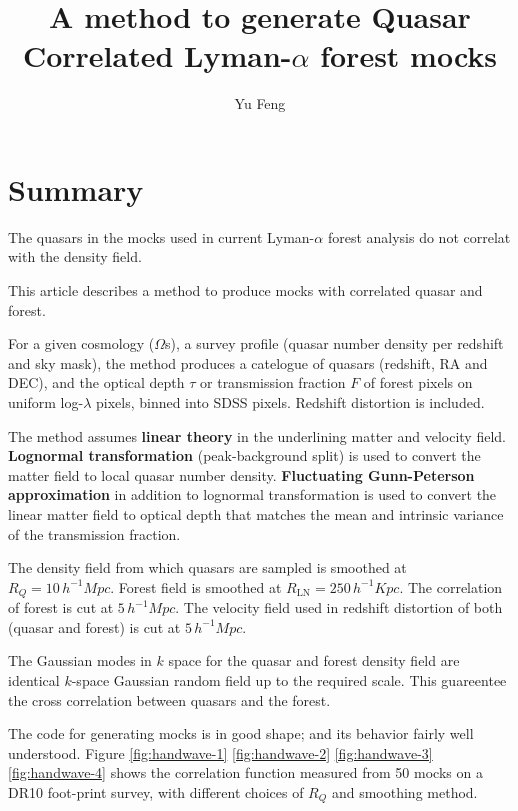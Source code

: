 \documentclass{paper}
\begin{document}
\newcommand{\diff}{\,\mathrm{d}}
\newcommand{\mpch}{\,\unit{h^{-1}Mpc}}
\newcommand{\kpch}{\,\unit{h^{-1}Kpc}}
\lstset{basicstyle=\footnotesize\ttfamily}
\title{A method to generate Quasar Correlated Lyman-$\alpha$
    forest mocks}
\author{Yu Feng}
\maketitle

\section{Summary}
    The quasars in the mocks used in current Lyman-$\alpha$ forest analysis 
    do not correlat with the density field. 

    This article describes a method to produce mocks with correlated quasar and forest.

    For a given cosmology ($\Omega$s), a survey
    profile (quasar number density per redshift and sky
    mask), the method produces a catelogue of quasars (redshift, RA
    and DEC), and the optical depth $\tau$ or transmission fraction $F$ of 
    forest pixels on uniform log-$\lambda$ pixels, binned into SDSS
    pixels. Redshift distortion is included. 
    
    The method assumes \textbf{linear theory} in the underlining
    matter and velocity field. \textbf{Lognormal transformation} (peak-background
    split) is used to convert the matter field to local quasar
    number density. \textbf{Fluctuating Gunn-Peterson
    approximation} in addition to lognormal transformation is used to
    convert the linear matter field to optical depth that
    matches the mean and intrinsic variance of the
    transmission fraction.
    
    The density field from which quasars are sampled is 
    smoothed at $R_Q = 10\mpch$.
    Forest field is smoothed at $R_\mathrm{LN} = 250\kpch$. The correlation
    of forest is cut at $5\mpch$. The velocity field used in
    redshift distortion of both (quasar and forest) is
    cut at $5\mpch$.

    The Gaussian modes in $k$ space for the quasar and forest
    density field are identical $k$-space Gaussian random field
    up to the required scale.  This guareentee the cross
    correlation between quasars and the forest.

    The code for generating mocks is in good shape; and its behavior
    fairly well understood.
    Figure 
    \ref{fig:handwave-1} 
    \ref{fig:handwave-2} 
    \ref{fig:handwave-3} 
    \ref{fig:handwave-4}
    shows the correlation function measured from 50 mocks on
    a DR10 foot-print survey, with different choices of
    $R_Q$ and smoothing method.
\end{document}
